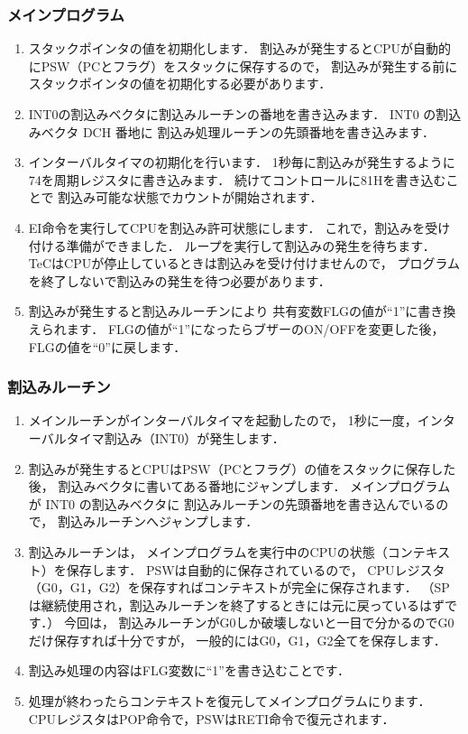 \subsubsection{メインプログラム}
\begin{enumerate}
\item スタックポインタの値を初期化します．
割込みが発生するとCPUが自動的にPSW（PCとフラグ）をスタックに保存するので，
割込みが発生する前にスタックポインタの値を初期化する必要があります．

\item INT0の割込みベクタに割込みルーチンの番地を書き込みます．
INT0 の割込みベクタ DCH 番地に
割込み処理ルーチンの先頭番地を書き込みます．

\item インターバルタイマの初期化を行います．
1秒毎に割込みが発生するように74を周期レジスタに書き込みます．
続けてコントロールに81Hを書き込むことで
割込み可能な状態でカウントが開始されます．

\item EI命令を実行してCPUを割込み許可状態にします．
これで，割込みを受け付ける準備ができました．
ループを実行して割込みの発生を待ちます．
TeCはCPUが停止しているときは割込みを受け付けませんので，
プログラムを終了しないで割込みの発生を待つ必要があります．

\item 割込みが発生すると割込みルーチンにより
共有変数FLGの値が``1''に書き換えられます．
FLGの値が``1''になったらブザーのON/OFFを変更した後，
FLGの値を``0''に戻します．
\end{enumerate}

\subsubsection{割込みルーチン}
\begin{enumerate}
\item メインルーチンがインターバルタイマを起動したので，
1秒に一度，インターバルタイマ割込み（INT0）が発生します．

\item 割込みが発生するとCPUはPSW（PCとフラグ）の値をスタックに保存した後，
割込みベクタに書いてある番地にジャンプします．
メインプログラムが INT0 の割込みベクタに
割込みルーチンの先頭番地を書き込んでいるので，
割込みルーチンへジャンプします．

\item 割込みルーチンは，
メインプログラムを実行中のCPUの状態（コンテキスト）を保存します．
PSWは自動的に保存されているので，
CPUレジスタ（G0，G1，G2）を保存すればコンテキストが完全に保存されます．
（SPは継続使用され，割込みルーチンを終了するときには元に戻っているはずです．）
今回は，
割込みルーチンがG0しか破壊しないと一目で分かるのでG0だけ保存すれば十分ですが，
一般的にはG0，G1，G2全てを保存します．

\item 割込み処理の内容はFLG変数に``1''を書き込むことです．

\item 処理が終わったらコンテキストを復元してメインプログラムにります．
CPUレジスタはPOP命令で，PSWはRETI命令で復元されます．

\end{enumerate}

